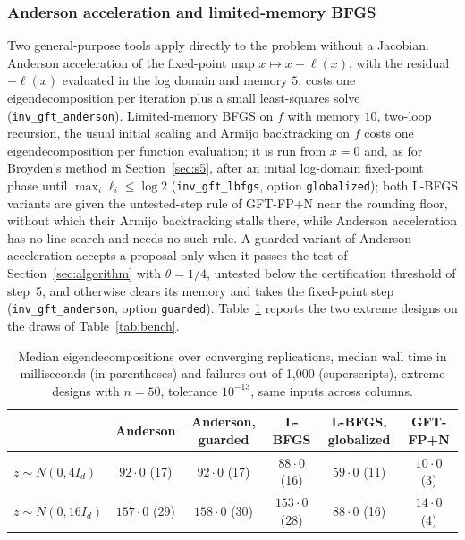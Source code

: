 \documentclass[11pt]{article}
\begin{document}
\subsubsection{Anderson acceleration and limited-memory BFGS}\label{sec:tools}

Two general-purpose tools apply directly to the problem without a
Jacobian. Anderson acceleration \citep{WalkerNi:2011} of the
fixed-point map $x\mapsto x-\ell(x)$, with the residual $-\ell(x)$
evaluated in the log domain and memory $5$, costs one
eigendecomposition per iteration plus a small least-squares solve
(\texttt{inv\_gft\_anderson}). Limited-memory BFGS
\citep{LiuNocedal:1989} on $f$ with memory $10$, two-loop recursion,
the usual initial scaling and Armijo backtracking on $f$ costs one
eigendecomposition per function evaluation; it is run from $x=0$ and,
as for Broyden's method in Section~\ref{sec:s5}, after an initial
log-domain fixed-point phase until $\max_i\ell_i\leq\log2$
(\texttt{inv\_gft\_lbfgs}, option \texttt{globalized}); both
L-BFGS variants are given the untested-step rule of GFT-FP+N near the
rounding floor, without which their Armijo backtracking stalls there,
while Anderson acceleration has no line search and needs no such rule.
A guarded variant of Anderson acceleration accepts a proposal only
when it passes the test of Section~\ref{sec:algorithm} with
$\theta=1/4$, untested below the certification threshold of step~5,
and otherwise clears its memory and takes the fixed-point step
(\texttt{inv\_gft\_anderson}, option \texttt{guarded}).
Table~\ref{tab:tools}
reports the two extreme designs on the draws of Table~\ref{tab:bench}.

\begin{table}[h]
\centering
\caption{Median eigendecompositions over converging replications, median
wall time in milliseconds (in parentheses) and failures out of
1{,}000 (superscripts), extreme designs with $n=50$, tolerance
$10^{-13}$, same inputs across columns.}\label{tab:tools}
\medskip
\small
\begin{tabular}{lccccc}
\toprule
 & Anderson & Anderson, guarded & L-BFGS & L-BFGS, globalized & GFT-FP+N\\
\midrule
$z\sim N(0,4I_d)$  & $92{\cdot}0$ (17) & $92{\cdot}0$ (17) & $88{\cdot}0$ (16) & $59{\cdot}0$ (11) & $10{\cdot}0$ (3)\\
$z\sim N(0,16I_d)$ & $157{\cdot}0$ (29) & $158{\cdot}0$ (30) & $153{\cdot}0$ (28) & $88{\cdot}0$ (16) & $14{\cdot}0$ (4)\\
\bottomrule
\end{tabular}
\end{table}
\end{document}
